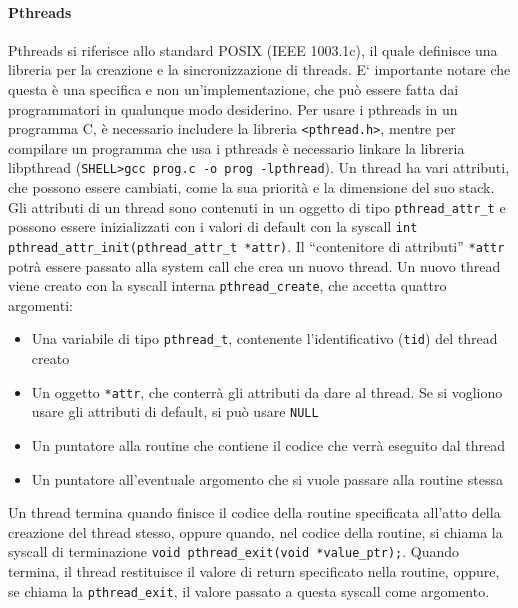 \documentclass[a4paper]{article}
\begin{document}
\paragraph{Pthreads}  Pthreads si riferisce allo standard POSIX (IEEE 1003.1c), il quale definisce una libreria per la creazione e la sincronizzazione di threads. E` importante notare che questa è una specifica e non un'implementazione, che può essere fatta dai programmatori in qualunque modo desiderino. \newline
Per usare i pthreads in un programma C, è necessario includere la libreria \texttt{\textless pthread.h\textgreater}, mentre per compilare un programma che usa i pthreads è necessario linkare la libreria libpthread (\texttt{SHELL\textgreater gcc prog.c -o prog -lpthread}). \newline
Un thread ha vari attributi, che possono essere cambiati, come la sua priorità e la dimensione del suo stack. Gli attributi di un thread sono contenuti in un oggetto di tipo \texttt{pthread\_attr\_t} e possono essere inizializzati con i valori di default con la syscall \texttt{int pthread\_attr\_init(pthread\_attr\_t *attr)}. Il ``contenitore di attributi'' \texttt{*attr} potrà essere passato alla system call che crea un nuovo thread. \newline
Un nuovo thread viene creato con la syscall interna \texttt{pthread\_create}, che accetta quattro argomenti:
\begin{itemize}
   \item Una variabile di tipo \texttt{pthread\_t}, contenente l'identificativo (\texttt{tid}) del thread creato
   \item Un oggetto \texttt{*attr}, che conterrà gli attributi da dare al thread. Se si vogliono usare gli attributi di default, si può usare \texttt{NULL}
   \item Un puntatore alla routine che contiene il codice che verrà eseguito dal thread
   \item Un puntatore all'eventuale argomento che si vuole passare alla routine stessa
\end{itemize}
Un thread termina quando finisce il codice della routine specificata all'atto della creazione del thread stesso, oppure quando, nel codice della routine, si chiama la syscall di terminazione \texttt{void pthread\_exit(void *value\_ptr);}. Quando termina, il thread restituisce il valore di return specificato nella routine, oppure, se chiama la \texttt{pthread\_exit}, il valore passato a questa syscall come argomento. \newline
\end{document}
